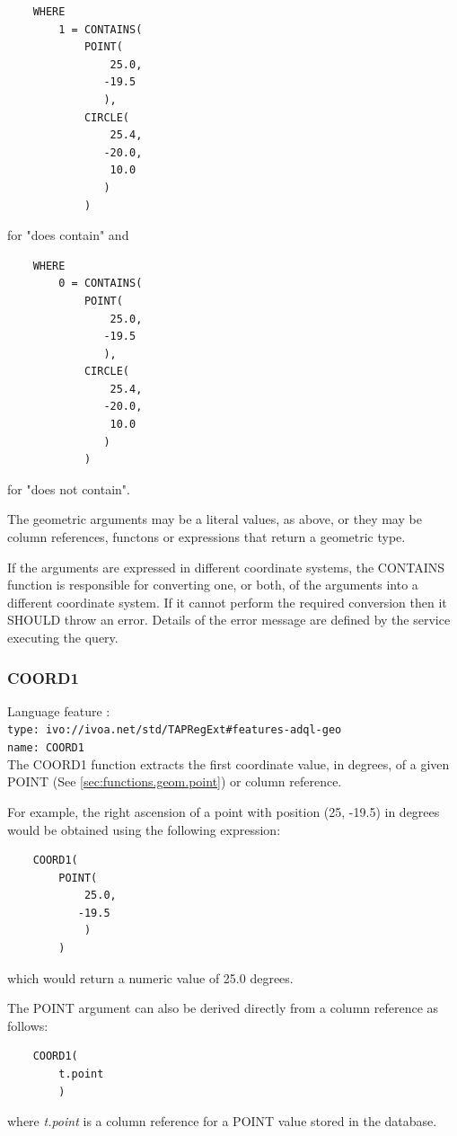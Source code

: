 \documentclass[11pt,a4paper]{ivoa}
\begin{document}
\begin{verbatim}
    WHERE
        1 = CONTAINS(
            POINT(
                25.0,
               -19.5
               ),
            CIRCLE(
                25.4,
               -20.0,
                10.0
               )
            )
\end{verbatim}
for "does contain" and

\begin{verbatim}
    WHERE
        0 = CONTAINS(
            POINT(
                25.0,
               -19.5
               ),
            CIRCLE(
                25.4,
               -20.0,
                10.0
               )
            )
\end{verbatim}
for "does not contain".

The geometric arguments may be a literal values, as above, or they may be
column references, functons or expressions that return a geometric type.

If the arguments are expressed in different coordinate systems, the
CONTAINS function is responsible for converting one, or both, of the
arguments into a different coordinate system.
If it cannot perform the required conversion then it SHOULD throw an
error. Details of the error message are defined by the service
executing the query.

\subsubsection{COORD1}
\label{sec:functions.geom.coord1}
{\footnotesize Language feature :}\\
{\footnotesize \verb|type: ivo://ivoa.net/std/TAPRegExt#features-adql-geo|}\\
{\footnotesize \verb|name: COORD1|}\\

The COORD1 function extracts the first coordinate value, in degrees, of a given
POINT (See \ref{sec:functions.geom.point}) or column reference.

For example, the right ascension of a point with position (25, -19.5) in
degrees would be obtained using the following expression:
\begin{verbatim}
    COORD1(
        POINT(
            25.0,
           -19.5
            )
        )
\end{verbatim}
\noindent
which would return a numeric value of 25.0 degrees.

The POINT argument can also be derived directly from a column
reference as follows:
\begin{verbatim}
    COORD1(
        t.point
        )
\end{verbatim}
\noindent
where \textit{t.point} is a column reference for a POINT value
stored in the database.
\end{document}
